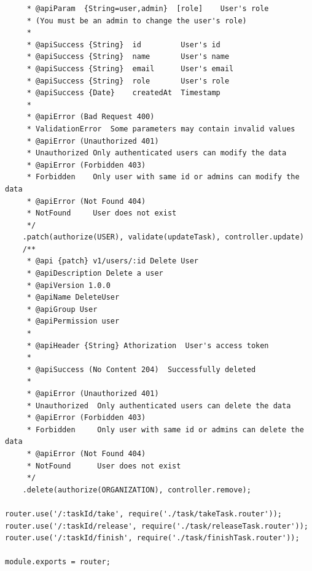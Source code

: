 \documentclass[12pt]{article}
\begin{document}
\begin{verbatim}
     * @apiParam  {String=user,admin}  [role]    User's role
     * (You must be an admin to change the user's role)
     *
     * @apiSuccess {String}  id         User's id
     * @apiSuccess {String}  name       User's name
     * @apiSuccess {String}  email      User's email
     * @apiSuccess {String}  role       User's role
     * @apiSuccess {Date}    createdAt  Timestamp
     *
     * @apiError (Bad Request 400)  
     * ValidationError  Some parameters may contain invalid values
     * @apiError (Unauthorized 401) 
     * Unauthorized Only authenticated users can modify the data
     * @apiError (Forbidden 403)    
     * Forbidden    Only user with same id or admins can modify the data
     * @apiError (Not Found 404)    
     * NotFound     User does not exist
     */
    .patch(authorize(USER), validate(updateTask), controller.update)
    /**
     * @api {patch} v1/users/:id Delete User
     * @apiDescription Delete a user
     * @apiVersion 1.0.0
     * @apiName DeleteUser
     * @apiGroup User
     * @apiPermission user
     *
     * @apiHeader {String} Athorization  User's access token
     *
     * @apiSuccess (No Content 204)  Successfully deleted
     *
     * @apiError (Unauthorized 401) 
     * Unauthorized  Only authenticated users can delete the data
     * @apiError (Forbidden 403)    
     * Forbidden     Only user with same id or admins can delete the data
     * @apiError (Not Found 404)    
     * NotFound      User does not exist
     */
    .delete(authorize(ORGANIZATION), controller.remove);

router.use('/:taskId/take', require('./task/takeTask.router'));
router.use('/:taskId/release', require('./task/releaseTask.router'));
router.use('/:taskId/finish', require('./task/finishTask.router'));

module.exports = router;

 \end{verbatim}
 
\end{document}
